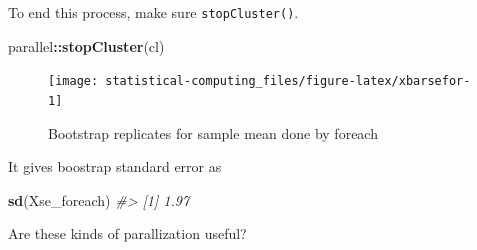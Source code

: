\documentclass[]{book}
\newenvironment{Shaded}{\begin{snugshade}}{\end{snugshade}}
\newcommand{\CommentTok}[1]{\textcolor[rgb]{0.56,0.35,0.01}{\textit{#1}}}
\newcommand{\DataTypeTok}[1]{\textcolor[rgb]{0.13,0.29,0.53}{#1}}
\newcommand{\DecValTok}[1]{\textcolor[rgb]{0.00,0.00,0.81}{#1}}
\newcommand{\KeywordTok}[1]{\textcolor[rgb]{0.13,0.29,0.53}{\textbf{#1}}}
\newcommand{\NormalTok}[1]{#1}
\newcommand{\OperatorTok}[1]{\textcolor[rgb]{0.81,0.36,0.00}{\textbf{#1}}}
\newcommand{\StringTok}[1]{\textcolor[rgb]{0.31,0.60,0.02}{#1}}
\theoremstyle{definition}
\theoremstyle{definition}
\theoremstyle{definition}
\theoremstyle{remark}
\begin{document}
To end this process, make sure \texttt{stopCluster()}.

\begin{Shaded}
\begin{Highlighting}[]
\NormalTok{parallel}\OperatorTok{::}\KeywordTok{stopCluster}\NormalTok{(cl)}
\end{Highlighting}
\end{Shaded}

\begin{Shaded}
\end{Shaded}

\begin{figure}[H]

{\centering \texttt{[image: statistical-computing\_files/figure-latex/xbarsefor-1]} 

}

\caption{Bootstrap replicates for sample mean done by foreach}\label{fig:xbarsefor}
\end{figure}

It gives boostrap standard error as

\begin{Shaded}
\begin{Highlighting}[]
\KeywordTok{sd}\NormalTok{(Xse_foreach)}
\CommentTok{#> [1] 1.97}
\end{Highlighting}
\end{Shaded}

Are these kinds of parallization useful?
\end{document}
